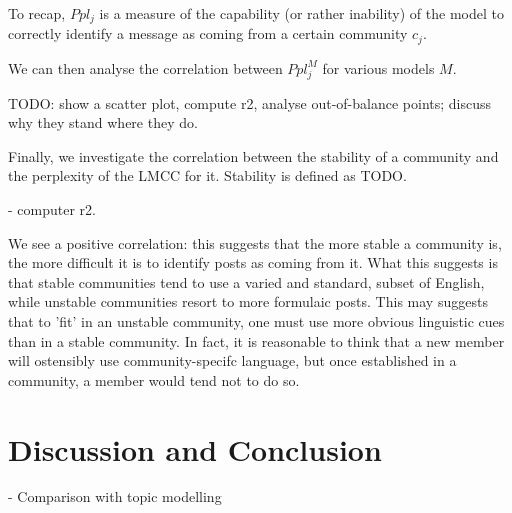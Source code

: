 \documentclass[11pt,a4paper]{article}
\begin{document}
To recap, \(Ppl_j\) is a measure of the capability (or rather
inability) of the model to correctly identify a message as coming from
a certain community $c_j$. 

We can then analyse the correlation between \(Ppl^M_j\) for various models $M$.

TODO: show a scatter plot, compute r2, analyse out-of-balance points; discuss why they stand where they do.


Finally, we investigate the correlation between the stability of a
community and the perplexity of the LMCC for it. Stability is defined as TODO.

- computer r2.

We see a positive correlation: this suggests that the more stable a
community is, the more difficult it is to identify posts as coming
from it. What this suggests is that stable communities tend to use a
varied and standard, subset of English, while unstable communities
resort to more formulaic posts. This may suggests that to 'fit' in an
unstable community, one must use more obvious linguistic cues than in
a stable community. In fact, it is reasonable to think that a new
member will ostensibly use community-specifc language, but once
established in a community, a member would tend not to do so.

\section{Discussion and Conclusion}

- Comparison with topic modelling



\end{document}
